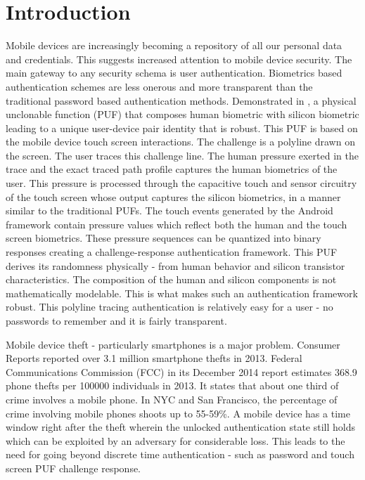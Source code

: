 \documentclass{acm_proc_article-sp}
\begin{document}
\section{Introduction}
\label{sec:intro}
Mobile devices are increasingly becoming a repository of all our personal data and credentials.
This suggests increased attention to mobile device security.
The main gateway to any security schema is user authentication.
Biometrics based authentication schemes are less onerous and 
more transparent than the traditional password based authentication methods. 
Demonstrated in \cite{ScheelTyagi15}, a physical unclonable function (PUF) that composes human biometric with silicon biometric
leading to a unique user-device pair identity that is robust.
This PUF is based on the mobile device touch screen interactions.
The challenge is a polyline drawn on the screen. The user
traces this challenge line. The human pressure exerted in the trace and the exact traced path
profile captures the human biometrics of the user. This pressure is
processed through the capacitive touch
and sensor circuitry of the touch screen whose output captures the silicon biometrics, in a 
manner similar to the traditional PUFs. The touch events generated by the Android framework
contain pressure values which reflect both the human and the touch screen biometrics.
These pressure sequences can be quantized into binary responses
creating a challenge-response authentication framework. 
This PUF derives its randomness physically - from human behavior and silicon
transistor characteristics. 
The composition of the human and silicon components is not mathematically
modelable. This is what makes such an authentication framework robust. This polyline tracing authentication is relatively easy for a user - no passwords to remember
and it is fairly transparent.
 
Mobile device theft - particularly smartphones is a major problem. Consumer Reports \cite{CR14}
reported over 3.1 million smartphone thefts in 2013. Federal Communications Commission (FCC)
\cite{FCC14}
in its December 2014 report estimates 368.9 phone thefts per 100000 individuals in 2013. It states 
that about one third of crime involves a mobile phone. In NYC and San Francisco, the percentage
of crime involving mobile phones shoots up to 55-59\%. A mobile device has a time window right after
the theft wherein the unlocked authentication state still holds
which can be exploited by an adversary for considerable loss. 
This leads to the need for going beyond discrete time authentication - such as
password and touch screen PUF challenge response.
\end{document}
